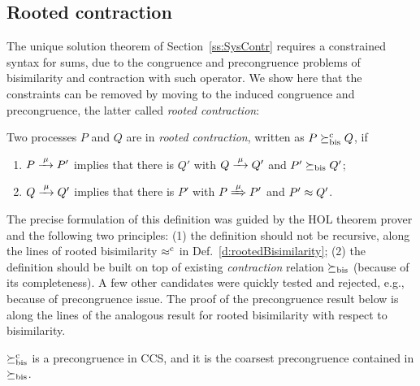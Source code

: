 \subsection{Rooted contraction}
\label{ss:new}

The unique solution theorem of Section~\ref{ss:SysContr} requires a
constrained syntax for sums, due to the congruence and precongruence
problems of bisimilarity and contraction with such operator. 
We show here that the constraints can be
removed by moving to the induced congruence and precongruence, the
latter called \emph{rooted contraction}:
\begin{definition}
\label{d:rcontra}
Two processes $P$ and $Q$ are in \emph{rooted contraction}, written as
 $P\mathrel{\succeq^{\rm{c}}_{\rm{bis}}} Q$, if
\begin{enumerate}
\item $P \arr\mu P'$ implies that there is $Q'$ with $Q \arr \mu Q'$
 and $P'\mathrel{\succeq_{\rm{bis}}} Q'$;
\item $Q \arr\mu Q'$   implies that there is $P'$ with $P \Arr \mu
 P'$ and $P' \approx Q'$\enspace.
\end{enumerate}
\end{definition}


The precise formulation of  this definition was guided by the HOL theorem
prover and
the following two principles: (1) the definition should not be recursive,
along the lines of rooted bisimilarity
$\mathrel{\approx^{\rm{c}}}$ in Def.~\ref{d:rootedBisimilarity};
(2) the definition should  be built on top of existing \emph{contraction}
relation $\mathrel{\succeq_{\rm{bis}}}$ (because of its completeness). 
A few other candidates were quickly tested and rejected, e.g.,
  because of  precongruence issue. The proof of the precongruence
 result below is along the lines of the analogous result
for rooted bisimilarity with respect to bisimilarity.

\begin{theorem}
\label{t:rcontrPrecongruence}
$\mathrel{\succeq^{\rm{c}}_{\rm{bis}}}$ is a precongruence in CCS, and it is the
coarsest precongruence contained in $\mathrel{\succeq_{\rm{bis}}}$.
\end{theorem}  

